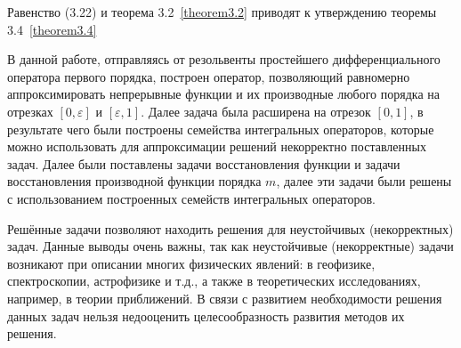 Равенство (3.22) и теорема 3.2~\eqref{theorem3.2} приводят к утверждению теоремы 3.4~\eqref{theorem3.4}

\conclusions

В данной работе, отправляясь от резольвенты простейшего дифференциального оператора первого порядка, построен оператор, позволяющий равномерно аппроксимировать непрерывные функции и их производные любого порядка на отрезках $ [0,\varepsilon] $ и $ [\varepsilon,1] $. Далее задача была расширена на отрезок $ [0,1] $, в результате чего были построены семейства интегральных операторов, которые можно использовать для аппроксимации решений некорректно поставленных задач. Далее были поставлены задачи восстановления функции и задачи восстановления производной функции порядка $ m $, далее эти задачи были решены с использованием построенных семейств интегральных операторов. 

Решённые задачи позволяют находить решения для неустойчивых (некорректных) задач. Данные выводы очень важны, так как неустойчивые (некорректные) задачи возникают при описании многих физических явлений: в геофизике, спектроскопии,  астрофизике и т.д., а также в теоретических исследованиях, например, в теории приближений. В связи с развитием необходимости решения данных задач нельзя недооценить целесообразность развития методов их решения.

%



